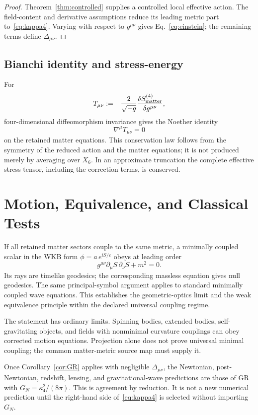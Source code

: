 \documentclass[11pt,a4paper]{article}
\theoremstyle{definition}
\theoremstyle{remark}
\begin{document}
\begin{proof}
Theorem~\ref{thm:controlled} supplies a controlled local effective action.
The field-content and derivative assumptions reduce its leading metric part
to~\eqref{eq:kappa4}.  Varying with respect to \(g^{\mu\nu}\) gives
Eq.~\eqref{eq:einstein}; the remaining terms define
\(\Delta_{\mu\nu}\).
\end{proof}

\subsection{Bianchi identity and stress-energy}

For
\[
 T_{\mu\nu}
 :=-\frac{2}{\sqrt{-g}}
   \frac{\delta S_{\rm matter}^{(4)}}{\delta g^{\mu\nu}},
\]
four-dimensional diffeomorphism invariance gives the Noether identity
\[
 \nabla^\mu T_{\mu\nu}=0
\]
on the retained matter equations.  This conservation law follows from the
symmetry of the reduced action and the matter equations; it is not produced
merely by averaging over \(X_6\).  In an approximate truncation the complete
effective stress tensor, including the correction terms, is conserved.

\section{Motion, Equivalence, and Classical Tests}

If all retained matter sectors couple to the same metric, a minimally coupled
scalar in the WKB form
\(
\phi=a\,e^{iS/\varepsilon}
\)
obeys at leading order
\[
 g^{\mu\nu}\partial_\mu S\,\partial_\nu S+m^2=0.
\]
Its rays are timelike geodesics; the corresponding massless equation gives
null geodesics.  The same principal-symbol argument applies to standard
minimally coupled wave equations.  This establishes the geometric-optics
limit and the weak equivalence principle within the declared universal
coupling regime.

The statement has ordinary limits.  Spinning bodies, extended bodies,
self-gravitating objects, and fields with nonminimal curvature couplings can
obey corrected motion equations.  Projection alone does not prove universal
minimal coupling; the common matter-metric source map must supply it.

Once Corollary~\ref{cor:GR} applies with negligible
\(\Delta_{\mu\nu}\), the Newtonian, post-Newtonian, redshift, lensing, and
gravitational-wave predictions are those of GR with
\(G_N=\kappa_4^2/(8\pi)\).  This is agreement by reduction.  It is not a new
numerical prediction until the right-hand side of~\eqref{eq:kappa4} is
selected without importing \(G_N\).
\end{document}
